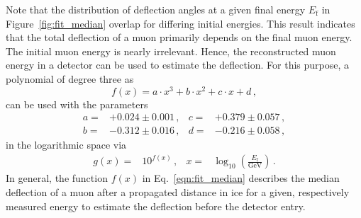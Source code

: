 Note that the distribution of deflection angles at a given final energy $E_{\mathrm{f}}$ in Figure~\ref{fig:fit_median} overlap for differing initial energies. This result indicates that the total deflection of a muon 
primarily depends on the final muon energy.
The initial muon energy is nearly irrelevant. 
Hence, the reconstructed muon 
energy in a detector can be used to estimate the deflection. For this 
purpose, a polynomial of degree three as 
\begin{equation}
     f(x) = a \cdot x^3 + b \cdot x^2 + c \cdot x + d \,,
    \label{eqn:fit_median}
\end{equation} 
can be used with the parameters 
\begin{align*}
    a =& +0.024 \pm 0.001\,,  & c =& +0.379 \pm 0.057\,,\\
    b =& -0.312 \pm 0.016\,,  & d =& -0.216 \pm 0.058\,,
\end{align*}
in the logarithmic space via 
\begin{align}
    g(x) =& 10^{f(x)}\,, & x =& \log_{10}\left(\frac{E_{\text{f}}}{\si{\giga\electronvolt}}\right)\,.
\end{align}
In general, the function $f(x)$ in Eq.~\eqref{eqn:fit_median} describes the median 
deflection of a muon after a propagated distance in ice for a given, respectively measured energy 
to estimate the deflection before the detector entry.

